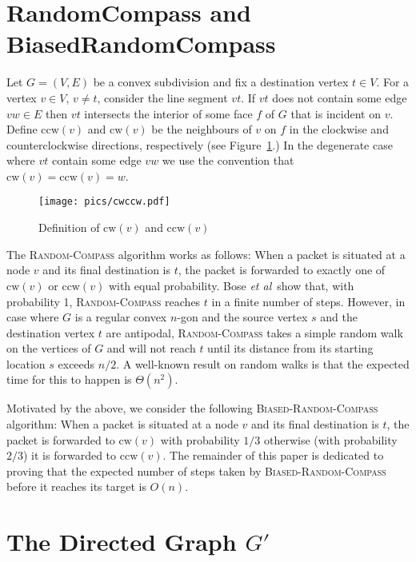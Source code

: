\documentclass [letterpaper] {article}
\newcommand{\etal}{\emph{et al}}
\newcommand{\cw}{\mathrm{cw}}
\newcommand{\ccw}{\mathrm{ccw}}
\begin{document}
\section{{\sc RandomCompass} and {\sc BiasedRandomCompass}}
\label{sec:algorithms}

Let $G=(V,E)$ be a convex subdivision and fix a destination vertex $t\in V$.  For a vertex $v\in V$, $v\neq t$, consider the line segment $vt$.  If $vt$ does not contain some edge $vw\in E$ then $vt$ intersects the interior of some face $f$ of $G$ that is incident on $v$.  Define $\ccw(v)$ and $\cw(v)$ be the neighbours of $v$ on $f$ in the clockwise and counterclockwise directions, respectively (see Figure~\ref{fig:cwccw}.)  In the degenerate case where $vt$ contain some edge $vw$ we use the convention that $\cw(v)=\ccw(v)=w$.

\begin{figure}[ht]
  \centering
  \texttt{[image: pics/cwccw.pdf]}
  \caption{Definition of $\mathrm{cw}(v)$ and $\mathrm{ccw}(v)$}
  \label{fig:cwccw}
\end{figure}

The \textsc{Random-Compass} algorithm \cite{bose04,bose02} works as follows:  When a packet is situated at a node $v$ and its final destination is $t$, the packet is forwarded to exactly one of $\cw(v)$ or $\ccw(v)$ with equal probability.  Bose \etal\ show that, with probability 1, \textsc{Random-Compass} reaches $t$ in a finite number of steps.  However, in case where $G$ is a regular convex $n$-gon and the source vertex $s$ and the destination vertex $t$ are antipodal, \textsc{Random-Compass} takes a simple random walk on the vertices of $G$ and will not reach $t$ until its distance from its starting location $s$ exceeds $n/2$.  A well-known result on random walks is that the expected time for this to happen is $\Theta(n^2)$.

Motivated by the above, we consider the following \textsc{Biased-Random-Compass} algorithm: When a packet is situated at a node $v$ and its final destination is $t$, the packet is forwarded to $\cw(v)$ with probability $1/3$ otherwise (with probability $2/3$) it is forwarded to $\ccw(v)$.  The remainder of this paper is dedicated to proving that the expected number of steps taken by \textsc{Biased-Random-Compass} before it reaches its target is $O(n)$.



\section{The Directed Graph $G'$}
\label{sec:properties}
\label{sec:graph}
\end{document}

